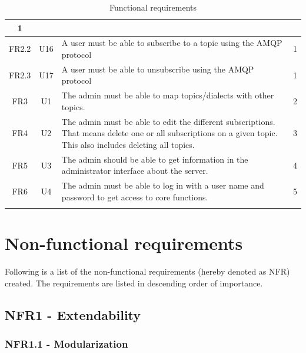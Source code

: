\begin{longtable}{@{\extracolsep{\fill}}|l|l|p{8cm}|l|@{}}
\multicolumn{1}{c|}{1} \\ \hline
\multicolumn{1}{|c|}{FR2.2} & \multicolumn{1}{c|}{U16} & A user must be able to subscribe to a topic using the AMQP protocol &
\multicolumn{1}{c|}{1} \\ \hline
\multicolumn{1}{|c|}{FR2.3} & \multicolumn{1}{c|}{U17} & A user must be able to unsubscribe using the AMQP protocol &
\multicolumn{1}{c|}{1} \\ \hline
\multicolumn{1}{|c|}{FR3} & \multicolumn{1}{c|}{U1} & The admin must be able to map topics/dialects with other topics. &
\multicolumn{1}{c|}{2} \\ \hline
\multicolumn{1}{|c|}{FR4} & \multicolumn{1}{c|}{U2} & The admin must be able to edit the different subscriptions. That means delete one or all subscriptions on a given topic. This also includes deleting all topics. & \multicolumn{1}{c|}{3} \\ \hline
\multicolumn{1}{|c|}{FR5} & \multicolumn{1}{c|}{U3} & The admin should be able to get information in the administrator interface about the server. &  \multicolumn{1}{c|}{4} \\ \hline
\multicolumn{1}{|c|}{FR6} & \multicolumn{1}{c|}{U4} & The admin must be able to log in with a user name and password to get access to core functions. & \multicolumn{1}{c|}{5} \\ \hline
\caption{Functional requirements}
\label{tab:func-requirements}
\end{longtable}

\clearpage

\section{Non-functional requirements}
\label{sec:requirements_engineering-non_functional_requirements}

Following is a list of the non-functional requirements (hereby denoted as NFR) created. The requirements are listed in descending order of importance. 

\subsection{NFR1 - Extendability}
\label{subsec:requirements_engineering-non_functional_requirements-extendibility}

\subsubsection{NFR1.1 - Modularization}
\label{subsec:requirements_engineering-non_functional_requirements-modularization}

